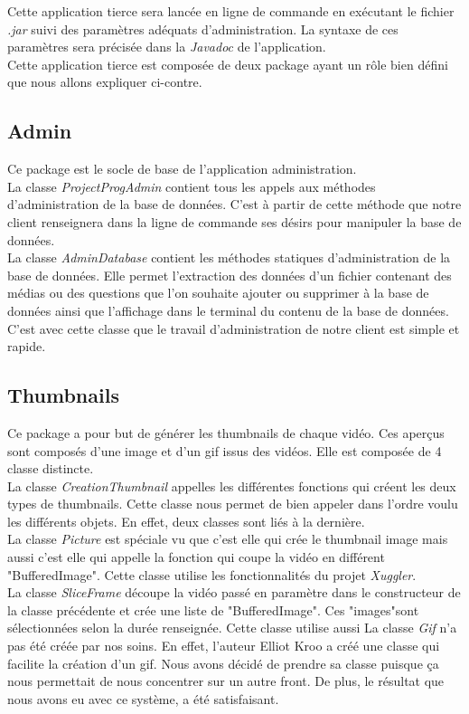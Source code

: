 Cette application tierce sera lancée en ligne de commande en exécutant le fichier \textit{.jar} suivi des paramètres adéquats d'administration. La syntaxe de ces paramètres sera précisée dans la \textit{Javadoc} de l'application.\\

Cette application tierce est composée de deux package ayant un rôle bien défini que nous allons expliquer ci-contre.

\subsection{Admin}

Ce package est le socle de base de l'application administration.\\
La classe \textit{ProjectProgAdmin} contient tous les appels aux méthodes d'administration de la base de données. C'est à partir de cette méthode que notre client renseignera dans la ligne de commande ses désirs pour manipuler la base de données.\\
La classe \textit{AdminDatabase} contient les méthodes statiques d'administration de la base de données. Elle permet l'extraction des données d'un fichier contenant des médias ou des questions que l'on souhaite ajouter ou supprimer à la base de données ainsi que l'affichage dans le terminal du contenu de la base de données. C'est avec cette classe que le travail d'administration de notre client est simple et rapide.

\subsection{Thumbnails}

Ce package a pour but de générer les thumbnails de chaque vidéo. Ces aperçus sont composés d'une image et d'un gif issus des vidéos. Elle est composée de 4 classe distincte.\\
La classe \textit{CreationThumbnail} appelles les différentes fonctions qui créent les deux types de thumbnails. Cette classe nous permet de bien appeler dans l'ordre voulu les différents objets. En effet, deux classes sont liés à la dernière.\\
La classe \textit{Picture} est spéciale vu que c'est elle qui crée le thumbnail image mais aussi c'est elle qui appelle la fonction qui coupe la vidéo en différent "BufferedImage". Cette classe utilise les fonctionnalités du projet \textit{Xuggler}.\\
La classe \textit{SliceFrame} découpe la vidéo passé en paramètre dans le constructeur de la classe précédente et crée une liste de "BufferedImage". Ces "images"sont sélectionnées selon la durée renseignée. Cette classe utilise aussi 
La classe \textit{Gif} n'a pas été créée par nos soins. En effet, l'auteur Elliot Kroo a créé une classe qui facilite la création d'un gif. Nous avons décidé de prendre sa classe puisque ça nous permettait de nous concentrer sur un autre front. De plus, le résultat que nous avons eu avec ce système, a été satisfaisant.